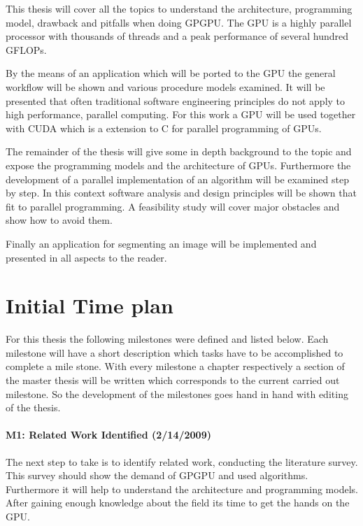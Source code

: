 This thesis will cover all the topics to understand the architecture,
programming model, drawback and pitfalls when doing \gls{GPGPU}. The \gls{GPU}
is a highly parallel processor with thousands of threads and a peak performance
of several hundred \glspl{GFLOP}.

By the means of an application which will be ported to the \gls{GPU} the general
workflow will be shown and various procedure models examined. It will be
presented that often traditional software engineering principles do not apply to
high performance, parallel computing. For this work a  \gls{GPU}
will be used together with \gls{CUDA} which is a extension to C for parallel
programming of \glspl{GPU}.

The remainder of the thesis will give some in depth background to the topic and
expose the programming models and the architecture of \glspl{GPU}. Furthermore the
development of a parallel implementation of an algorithm will be examined step
by step. In this context software analysis and design principles will be shown
that fit to parallel programming. A feasibility study will cover major obstacles
and show how to avoid them.

Finally an application for segmenting an image will be implemented and presented
in all aspects to the reader.

\section{Initial Time plan} 
\label{sub:time_plan} 
For this thesis the following milestones were defined and listed below. Each
milestone will have a short description which tasks have to be accomplished to
complete a mile stone. With every milestone a chapter respectively a section of
the master thesis will be written which corresponds to the current carried out
milestone. So the development of the milestones goes hand in hand with editing
of the thesis.

\paragraph{M1: Related Work Identified (2/14/2009)} %
\label{par:m1_related_work_identified}
The next step to take is to identify related work, conducting the literature 
survey. This survey should show the demand of \gls{GPGPU} and used algorithms. 
Furthermore it will help to understand the architecture and programming models. 
After gaining enough knowledge about the field its time to get the hands on the 
\gls{GPU}.
